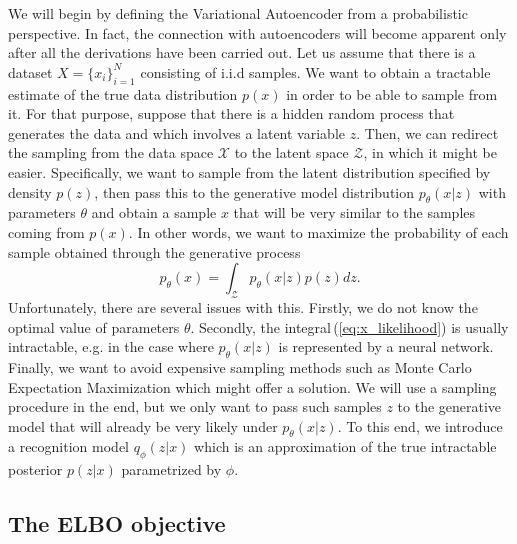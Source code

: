 We will begin by defining the Variational Autoencoder from a probabilistic
perspective. In fact, the connection with autoencoders will become
apparent only after all the derivations have been carried out. Let
us assume that there is a dataset $X=\{x_{i}\}_{i=1}^{N}$ consisting
of i.i.d samples. We want to obtain a tractable estimate of the true
data distribution $p(x)$ in order to be able to sample from it. For
that purpose, suppose that there is a hidden random process that generates
the data and which involves a latent variable $z$. Then, we can redirect
the sampling from the data space $\mathcal{X}$ to the latent space
$\mathcal{Z}$, in which it might be easier. Specifically, we want
to sample from the latent distribution specified by density $p(z)$,
then pass this to the generative model distribution $p_{\theta}(x|z)$
with parameters $\theta$ and obtain a sample $x$ that will be very
similar to the samples coming from $p(x)$. In other words, we want
to maximize the probability of each sample obtained through the generative
process
\begin{equation}
p_{\theta}(x)=\int_{\mathcal{Z}}p_{\theta}(x|z)p(z)dz.\label{eq:x_likelihood}
\end{equation}
Unfortunately, there are several issues with this. Firstly, we do
not know the optimal value of parameters $\theta$. Secondly, the
integral\,(\ref{eq:x_likelihood}) is usually intractable, e.g. in
the case where $p_{\theta}(x|z)$ is represented by a neural network.
Finally, we want to avoid expensive sampling methods such as Monte
Carlo Expectation Maximization which might offer a solution. We will
use a sampling procedure in the end, but we only want to pass such
samples $z$ to the generative model that will already be very likely
under $p_{\theta}(x|z)$. To this end, we introduce a recognition
model $q_{\phi}(z|x)$ which is an approximation of the true intractable
posterior $p(z|x)$ parametrized by $\phi$.

\subsection{The ELBO objective}

